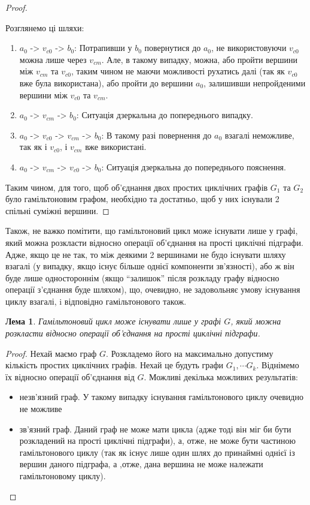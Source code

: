 \documentclass[a4paper,14pt,ukrainian]{extarticle}
\newtheorem{lemma}{Лема}
\begin{document}
\begin{proof}
\begin{enumerate}
                Розглянемо ці шляхи:
                \begin{enumerate}
                    \item{$a_0$ -> $v_{c0}$ -> $b_0$:} Потрапивши у $b_0$ повернутися до $a_0$, не використовуючи $v_{c0}$ можна лише через $v_{cm}$.
                        Але, в такому випадку, можна, або пройти вершини між $v_{cm}$ та $v_{c0}$, таким чином не маючи можливості рухатись далі (так як $v_{c0}$ вже була використана), або пройти до вершини $a_0$, залишивши непройденими вершини між $v_{c0}$ та $v_{cm}$.
                    \item{$a_0$ -> $v_{cm}$ -> $b_0$:} Ситуація дзеркальна до попереднього випадку.
                    \item{$a_0$ -> $v_{c0}$ -> $v_{cm}$ -> $b_0$:} В такому разі повернення до $a_0$ взагалі неможливе, так як і $v_{c0}$, і $v_{cm}$ вже використані.
                    \item{$a_0$ -> $v_{cm}$ -> $v_{c0}$ -> $b_0$:} Ситуація дзеркальна до попереднього пояснення.
                \end{enumerate}
        \end{enumerate}
        Таким чином, для того, щоб об’єднання двох простих циклічних графів $G_1$ та $G_2$ було гамільтоновим графом, необхідно та достатньо, щоб у них існували 2 спільні суміжні вершини.
    \end{proof}
    Також, не важко помітити, що гамільтоновий цикл може існувати лише у графі, який можна розкласти відносно операції об’єднання на прості циклічні підграфи.
    Адже, якщо це не так, то між деякими 2 вершинами не будо існувати шляху взагалі (у випадку, якщо існує більше однієї компоненти зв’язності), або ж він буде лише одностороннім (якщо ``залишок'' після розкладу графу відносно операції з’єднання буде шляхом), що, очевидно, не задовольняє умову існування циклу взагалі, i відповідно гамільтонового також.
    \begin{lemma}
        Гамільтоновий цикл може існувати лише у графі $G$, який можна розкласти відносно операції об’єднання на прості циклічні підграфи.
    \end{lemma}
    \begin{proof}
        Нехай маємо граф $G$.
        Розкладемо його на максимально допустиму кількість простих циклічних графів.
        Нехай це будуть графи $G_1, \cdots G_k$.
        Віднімемо їх відносно операції об’єднання від $G$.
        Можливі декілька можливих результатів:
        \begin{itemize}
            \item незв’язний граф.
                У такому випадку існування гамільтонового циклу очевидно не можливе
            \item зв’язний граф. 
                Даний граф не може мати цикла (адже тоді він міг би бути розкладений на прості циклічні підграфи), а, отже, не може бути частиною гамільтонового циклу (так як існує лише один шлях до принаймні однієї із вершин даного підграфа, а ,отже, дана вершина не може належати гамільтоновому циклу).
        \end{itemize}
    \end{proof}
\end{document}
